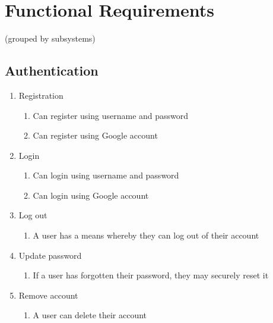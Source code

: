 \documentclass[12pt]{article}
\begin{document}
\newpage

\section{Functional Requirements}

 (grouped by subsystems)

\subsection{Authentication}
\begin{enumerate}
  \item Registration
        \begin{enumerate}
          \item Can register using username and password
          \item Can register using Google account
        \end{enumerate}
  \item Login
        \begin{enumerate}
          \item Can login using username and password
          \item Can login using Google account
        \end{enumerate}
  \item Log out
        \begin{enumerate}
          \item A user has a means whereby they can log out of their account
        \end{enumerate}
  \item Update password
        \begin{enumerate}
          \item If a user has forgotten their password, they may securely reset it
        \end{enumerate}
  \item Remove account
        \begin{enumerate}
          \item A user can delete their account
        \end{enumerate}
\end{enumerate}
\end{document}
